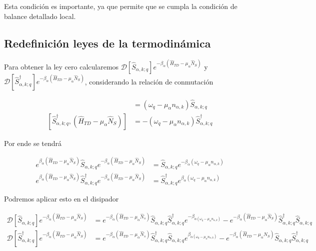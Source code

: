 \begin{appendixs}
Esta condición es importante, ya que permite que se cumpla la condición de balance detallado local. 

\label{apendixKMS}


\newpage

\subsection{Redefinición leyes de la termodinámica}
Para obtener la ley cero calcularemos $\mathcal{D}[\hat{S}_{\alpha,k;q}]e^{-\beta_{\alpha}(\hat{H}_{TD} - \mu_{\alpha}\hat{N}_{S})}$ y $\mathcal{D}[\hat{S}^{\dagger}_{\alpha,k;q}]e^{-\beta_{\alpha}(\hat{H}_{TD} - \mu_{\alpha}\hat{N}_{S})}$, considerando la relación de conmutación

\begin{align*}
    [\hat{S}_{\alpha,k;q},(\hat{H}_{TD} - \mu_{\alpha}\hat{N}_{S})] & = (\omega_{q} - \mu_{\alpha}n_{\alpha,k})\hat{S}_{\alpha,k;q}  \\
    [\hat{S}^{\dagger}_{\alpha,k;q},(\hat{H}_{TD} - \mu_{\alpha}\hat{N}_{S})] & = -(\omega_{q} - \mu_{\alpha}n_{\alpha,k})\hat{S}^{\dagger}_{\alpha,k;q}
\end{align*}

 Por ende se tendrá

 \begin{align*}
    e^{\beta_{\alpha}(\hat{H}_{TD} - \mu_{\alpha}\hat{N}_{S})}\hat{S}_{\alpha,k;q} e^{-\beta_{\alpha}(\hat{H}_{TD} - \mu_{\alpha}\hat{N}_{S})} & = \hat{S}_{\alpha,k;q}e^{-\beta_{\alpha}(\omega_{q} - \mu_{\alpha}n_{\alpha,k})} \\
    e^{\beta_{\alpha}(\hat{H}_{TD} - \mu_{\alpha}\hat{N}_{S})}\hat{S}^{\dagger}_{\alpha,k;q} e^{-\beta_{\alpha}(\hat{H}_{TD} - \mu_{\alpha}\hat{N}_{S})} & = \hat{S}^{\dagger}_{\alpha,k;q}e^{\beta_{\alpha}(\omega_{q} - \mu_{\alpha}n_{\alpha,k})}
 \end{align*}

Podremos aplicar esto en el disipador

\begin{align*}
    \mathcal{D}[\hat{S}_{\alpha,k;q}]e^{-\beta_{\alpha}(\hat{H}_{TD} - \mu_{\alpha}\hat{N}_{S})} & =  e^{-\beta_{\alpha}(\hat{H}_{TD} - \mu_{\alpha}\hat{N}_{s})} \hat{S}_{\alpha,k;q}\hat{S}^{\dagger}_{\alpha,k;q} e^{-\beta_{\alpha(\omega_{q} - \mu_{\alpha}n_{\alpha,k})}} - e^{-\beta_{\alpha}(\hat{H}_{TD} - \mu_{\alpha}\hat{N}_{S})} \hat{S}^{\dagger}_{\alpha,k;q}\hat{S}_{\alpha,k;q} \\
    \mathcal{D}[\hat{S}^{\dagger}_{\alpha,k;q}]e^{-\beta_{\alpha}(\hat{H}_{TD} - \mu_{\alpha}\hat{N}_{S})} & = e^{-\beta_{\alpha}(\hat{H}_{TD} - \mu_{\alpha}\hat{N}_{s})} \hat{S}^{\dagger}_{\alpha,k;q}\hat{S}_{\alpha,k;q} e^{\beta_{\alpha(\omega_{q} - \mu_{\alpha}n_{\alpha,k})}} - e^{-\beta_{\alpha}(\hat{H}_{TD} - \mu_{\alpha}\hat{N}_{S})} \hat{S}_{\alpha,k;q}\hat{S}^{\dagger}_{\alpha,k;q} 
\end{align*}


\end{appendixs}
